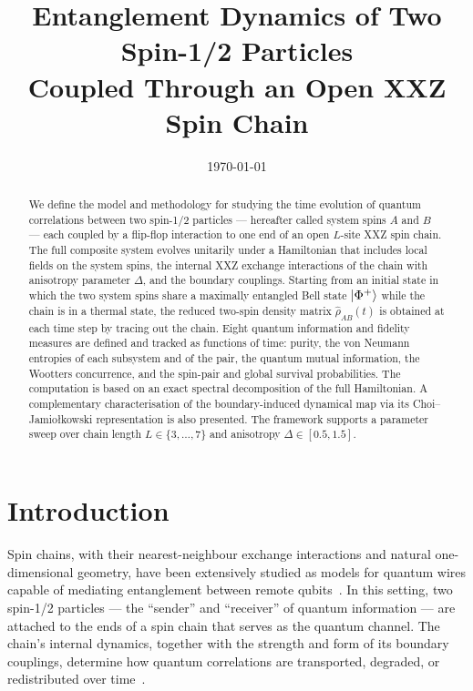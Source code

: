 \documentclass[12pt,a4paper]{article}
\newcommand{\rhohat}{\hat{\rho}}
\begin{document}

\title{\textbf{Entanglement Dynamics of Two Spin-1/2 Particles\\
       Coupled Through an Open XXZ Spin Chain}}
\author{}
\date{\today}
\maketitle
\thispagestyle{empty}

\begin{abstract}
We define the model and methodology for studying the time evolution of quantum
correlations between two spin-1/2 particles — hereafter called system spins $A$
and $B$ — each coupled by a flip-flop interaction to one end of an open
$L$-site XXZ spin chain.  The full composite system evolves unitarily under a
Hamiltonian that includes local fields on the system spins, the internal
XXZ exchange interactions of the chain with anisotropy parameter $\Delta$, and
the boundary couplings.  Starting from an initial state in which the two system
spins share a maximally entangled Bell state $\ket{\Phi^+}$ while the chain is
in a thermal state, the reduced
two-spin density matrix $\rhohat_{AB}(t)$ is obtained at each time step by
tracing out the chain.  Eight quantum information and fidelity measures are
defined and tracked as functions of time: purity, the von Neumann entropies of
each subsystem and of the pair, the quantum mutual information, the Wootters
concurrence, and the spin-pair and global survival probabilities.  The
computation is based on an exact spectral decomposition of the full Hamiltonian.  A complementary
characterisation of the boundary-induced dynamical map via its
Choi--Jamio{\l}kowski representation is also presented.  The framework supports a parameter sweep
over chain length $L\in\{3,\ldots,7\}$ and anisotropy $\Delta\in[0.5,1.5]$.
\end{abstract}

\newpage
\tableofcontents
\newpage

\section{Introduction}
\label{sec:intro}
Spin chains, with their nearest-neighbour
exchange interactions and natural one-dimensional geometry, have been extensively
studied as models for quantum wires capable of mediating entanglement between
remote qubits~\cite{bose2003,christandl2004prl,christandl2005pra,osborne2004,subrahmanyam2004,bose2007review,Bayat2005,NielsenChuang2000}.  In this setting, two
spin-1/2 particles — the ``sender'' and ``receiver'' of quantum information —
are attached to the ends of a spin chain that serves as the quantum channel.
The chain's internal dynamics, together with the strength and form of its
boundary couplings, determine how quantum correlations are transported, degraded,
or redistributed over time~\cite{burgarth2005,wojcik2005,venuti2006,yung2005,godsil2012,cai2006decoherence,bayat2008memory,qin2013thermal}.
\end{document}
